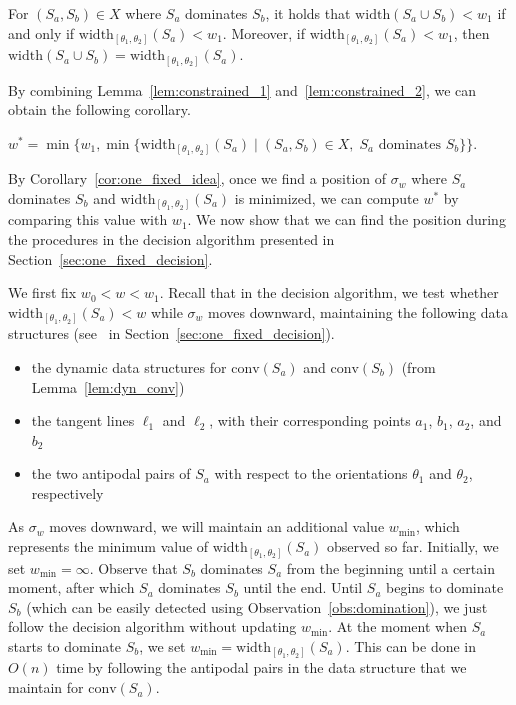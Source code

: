 \documentclass[english,a4paper, cleveref, autoref, thm-restate, nolineno]{socg-lipics-v2021}
\theoremstyle{star}
\theoremstyle{claimstar}
\newcommand{\width}{\ensuremath{\mathrm{width}}}
\newcommand{\conv}{\ensuremath{\mathrm{conv}}}
\begin{document}
\begin{lemma}
    \label{lem:constrained_2}
    For $(S_a,  S_b) \in X$ where $S_a$ dominates $S_b$, it holds that $\width(S_a \cup S_b) < w_1$
    if and only if $\width_{[\theta_1, \theta_2]}(S_a) < w_1$. 
    Moreover, if $\width_{[\theta_1, \theta_2]}(S_a) < w_1$, 
    then $\width(S_a \cup S_b)  =\width_{[\theta_1, \theta_2]}(S_a)$.
\end{lemma}

By combining Lemma~\ref{lem:constrained_1} and~\ref{lem:constrained_2}, we can obtain the following corollary.  

\begin{corollary}
    \label{cor:one_fixed_idea}
    $w^* = \min\{ w_1,  \min \{\width_{[\theta_1, \theta_2]}(S_a) \mid (S_a, S_b) \in X, \; S_a \textrm{ dominates } S_b\} \}$. 
\end{corollary}

By Corollary~\ref{cor:one_fixed_idea}, 
once we find a position of $\sigma_w$ where $S_a$ dominates $S_b$ and $\width_{[\theta_1, \theta_2]}(S_a)$ is minimized,
we can compute $w^*$ by comparing this value with $w_1$.
We now show that we can find the position during the procedures in the decision algorithm presented in Section~\ref{sec:one_fixed_decision}. 


We first fix $w_0 < w < w_1$. 
Recall that in the decision algorithm, we test whether $\width_{[\theta_1, \theta_2]}(S_a) < w$ while $\sigma_w$ moves downward, maintaining the following data structures
(see~\emph{} in Section~\ref{sec:one_fixed_decision}).

\begin{itemize}
    \item the dynamic data structures for $\conv(S_a)$ and $\conv(S_b)$ (from Lemma~\ref{lem:dyn_conv})
    \item the tangent lines $\ell_1$ and $\ell_2$, with their corresponding points $a_1$, $b_1$, $a_2$, and $b_2$
    \item the two antipodal pairs of $S_a$ with respect to the orientations $\theta_1$ and $\theta_2$, respectively
\end{itemize}

As $\sigma_w$ moves downward, we will maintain an additional value $w_{\min}$, which represents the minimum value of $\width_{[\theta_1, \theta_2]}(S_a)$ observed so far. 
Initially, we set $w_{\min} = \infty$.
Observe that $S_b$ dominates $S_a$ from the beginning until a certain moment, after which $S_a$ dominates $S_b$ until the end. 
Until $S_a$ begins to dominate $S_b$ (which can be easily detected using Observation~\ref{obs:domination}), we just follow the decision algorithm without updating $w_{\min}$. 
At the moment when $S_a$ starts to dominate $S_b$, we set  $w_{\min} = \width_{[\theta_1, \theta_2]}(S_a)$. 
This can be done in $O(n)$ time by following the antipodal pairs in the data structure that we maintain for $\conv(S_a)$.
\end{document}
